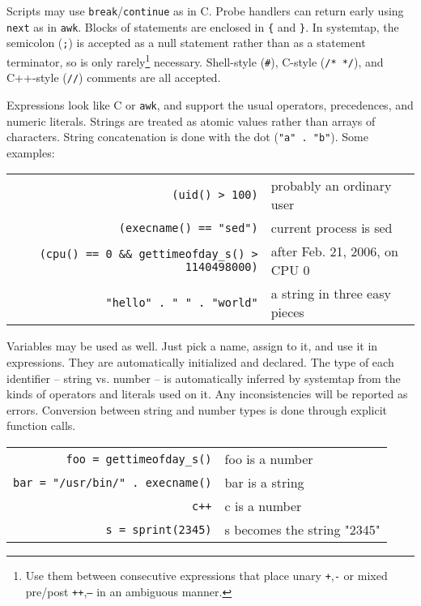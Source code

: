 \documentclass{article}
\renewcommand{\nomenclature}[2]{}
\begin{document}
Scripts may use \verb+break+/\verb+continue+ as in C.
Probe handlers can return early using \verb+next+ as in \verb+awk+.
Blocks of statements are enclosed in \verb+{+ and \verb+}+.  In
systemtap, the semicolon (\verb+;+) is accepted as a null statement
rather than as a statement terminator, so is only rarely\footnote{Use
them between consecutive expressions that place unary {\tt +},{\tt -}
or mixed pre/post {\tt ++},{\tt --} in an ambiguous manner.}
necessary.  Shell-style (\verb+#+), C-style (\verb+/* */+), and
C++-style (\verb+//+) comments are all accepted.

Expressions look like C or \verb+awk+, and support the usual
operators, precedences, and numeric literals.  Strings are treated as
atomic values rather than arrays of characters.  String concatenation
is done with the dot (\verb+"a" . "b"+).  Some examples:

\begin{tabular}{rl}
\verb+(uid() > 100)+ & probably an ordinary user \\
\verb+(execname() == "sed")+ & current process is sed \\
\verb+(cpu() == 0 && gettimeofday_s() > 1140498000)+ & after Feb. 21, 2006, on CPU 0 \\
\verb+"hello" . " " . "world"+ & a string in three easy pieces \\
\end{tabular}

Variables may be used as well.  Just pick a name, assign to it, and
use it in expressions.  They are automatically initialized and
declared.  The type of each identifier -- string vs. number -- is
automatically inferred by systemtap from the kinds of operators and
literals used on it.  Any inconsistencies will be reported as errors.
Conversion between string and number types is done through explicit
function calls.

\nomenclature{type}{A designation of each identifier such as a
variable, or function, or array value or index, as containing a string
or number.}  \nomenclature{string}{A \verb+\0+-terminated character
string of up to a fixed limit in length.}  \nomenclature{number}{A
64-bit signed integer.}  \nomenclature{type inference}{The automatic
determination of the type of each variable, function parameter, array
value and index, based on their use.}

\begin{tabular}{rl}
\verb+foo = gettimeofday_s()+ & foo is a number \\
\verb+bar = "/usr/bin/" . execname()+ & bar is a string \\
\verb|c++| & c is a number \\
\verb+s = sprint(2345)+ & s becomes the string "2345" \\
\end{tabular}
\end{document}
